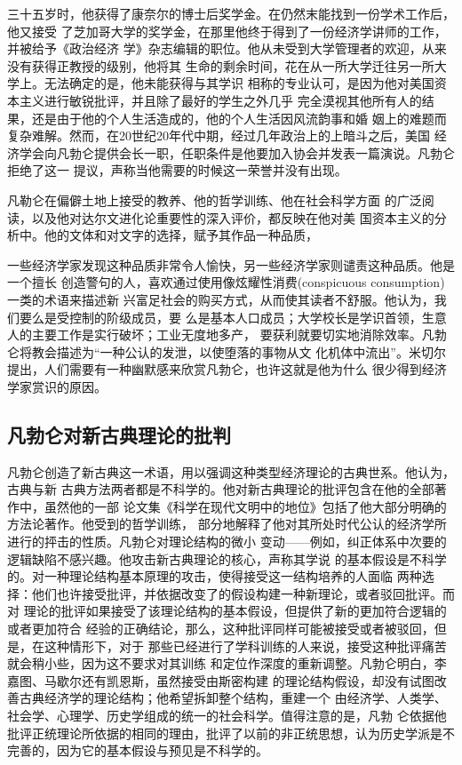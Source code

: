 三十五岁时，他获得了康奈尔的博士后奖学金。在仍然末能找到一份学术工作后，他又接受
了芝加哥大学的奖学金，在那里他终于得到了一份经济学讲师的工作，并被给予《政治经济
学》杂志编辑的职位。他从未受到大学管理者的欢迎，从来没有获得正教授的级别，他将其
生命的剩余时间，花在从一所大学迁往另一所大学上。无法确定的是，他未能获得与其学识
相称的专业认可，是因为他对美国资本主义进行敏锐批评，并且除了最好的学生之外几乎
完全漠视其他所有人的结果，还是由于他的个人生活造成的，他的个人生活因风流韵事和婚
姻上的难题而复杂难解。然而，在20世纪20年代中期，经过几年政治上的上暗斗之后，美国
经济学会向凡勃仑提供会长一职，任职条件是他要加入协会并发表一篇演说。凡勃仑拒绝了这一
提议，声称当他需要的时候这一荣誉并没有出现。

凡勒仑在偏僻土地上接受的教养、他的哲学训练、他在社会科学方面
的广泛阅读，以及他对达尔文进化论重要性的深入评价，都反映在他对美
国资本主义的分析中。他的文体和对文字的选择，赋予其作品一种品质，

一些经济学家发现这种品质非常令人愉快，另一些经济学家则谴责这种品质。他是一个擅长
创造警句的人，喜欢通过使用像炫耀性消费(conspicuous consumption)一类的术语来描述新
兴富足社会的购买方式，从而使其读者不舒服。他认为，我们要么是受控制的阶级成员，要
么是基本人口成员；大学校长是学识首领，生意人的主要工作是实行破坏；工业无度地多产，
要获利就要切实地消除效率。凡勃仑将教会描述为“一种公认的发泄，以使堕落的事物从文
化机体中流出”。米切尔提出，人们需要有一种幽默感来欣赏凡勃仑，也许这就是他为什么
很少得到经济学家赏识的原因。

\subsection{凡勃仑对新古典理论的批判}

凡勃仑创造了新古典这一术语，用以强调这种类型经济理论的古典世系。他认为，古典与新
古典方法两者都是不科学的。他对新古典理论的批评包含在他的全部著作中，虽然他的一部
论文集《科学在现代文明中的地位》包括了他大部分明确的方法论著作。他受到的哲学训练，
部分地解释了他对其所处时代公认的经济学所进行的抨击的性质。凡勃仑对理论结构的微小
变动——例如，纠正体系中次要的逻辑缺陷不感兴趣。他攻击新古典理论的核心，声称其学说
的基本假设是不科学的。对一种理论结构基本原理的攻击，使得接受这一结构培养的人面临
两种选择：他们也许接受批评，并依据改变了的假设构建一种新理论，或者驳回批评。而对
理论的批评如果接受了该理论结构的基本假设，但提供了新的更加符合逻辑的或者更加符合
经验的正确结论，那么，这种批评同样可能被接受或者被驳回，但是，在这种情形下，对于
那些已经进行了学科训练的人来说，接受这种批评痛苦就会稍小些，因为这不要求对其训练
和定位作深度的重新调整。凡勃仑明白，李嘉图、马歇尔还有凯恩斯，虽然接受由斯密构建
的理论结构假设，却没有试图改善古典经济学的理论结构；他希望拆卸整个结构，重建一个
由经济学、人类学、社会学、心理学、历史学组成的统一的社会科学。值得注意的是，凡勃
仑依据他批评正统理论所依据的相同的理由，批评了以前的非正统思想，认为历史学派是不
完善的，因为它的基本假设与预见是不科学的。

